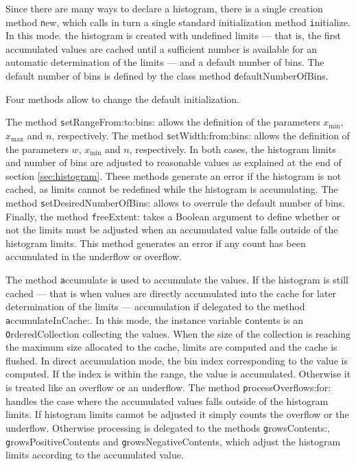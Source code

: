 Since there are many ways to declare a histogram, there is a
single creation method {\texttt new}, which calls in turn a single
standard initialization method {\texttt initialize}. In this mode. the
histogram is created with undefined limits --- that is, the first
accumulated values are cached until a sufficient number is
available for an automatic determination of the limits --- and a
default number of bins. The default number of bins is defined by
the class method {\texttt defaultNumberOfBins}.

\noindent Four methods allow to change the default initialization.

The method {\texttt setRangeFrom:to:bins:} allows the definition of
the parameters $x_{\min}$, $x_{\max}$ and $n$, respectively. The
method {\texttt setWidth:from:bins:} allows the definition of the
parameters $w$, $x_{\min}$ and $n$, respectively. In both cases,
the histogram limits and number of bins are adjusted to reasonable
values as explained at the end of section \ref{sec:histogram}.
These methods generate an error if the histogram is not cached, as
limits cannot be redefined while the histogram is accumulating.
The method {\texttt setDesiredNumberOfBins:} allows to overrule the
default number of bins. Finally, the method {\texttt freeExtent:}
takes a Boolean argument to define whether or not the limits must
be adjusted when an accumulated value falls outside of the
histogram limits. This method generates an error if any count has
been accumulated in the underflow or overflow.

The method {\texttt accumulate} is used to accumulate the values. If
the histogram is still cached --- that is when values are directly
accumulated into the cache for later determination of the limits
--- accumulation if delegated to the method {\texttt
accumulateInCache:}. In this mode, the instance variable {\texttt
contents} is an {\texttt OrderedCollection} collecting the values.
When the size of the collection is reaching the maximum size
allocated to the cache, limits are computed and the cache is
flushed. In direct accumulation mode, the bin index corresponding
to the value is computed. If the index is within the range, the
value is accumulated. Otherwise it is treated like an overflow or
an underflow. The method {\texttt processOverflows:for:} handles the
case where the accumulated values falls outside of the histogram
limits. If histogram limits cannot be adjusted it simply counts
the overflow or the underflow. Otherwise processing is delegated
to the methods {\texttt growsContents:}, {\texttt growsPositiveContents}
and {\texttt growsNegativeContents}, which adjust the histogram limits
according to the accumulated value.

